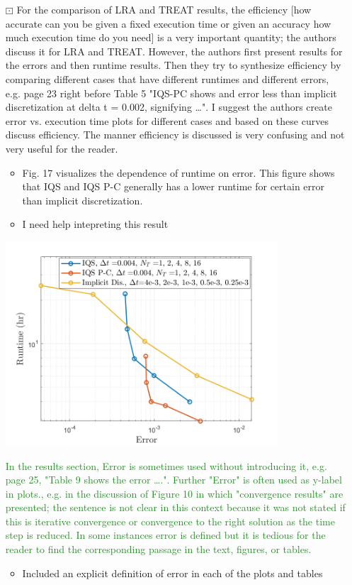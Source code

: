 \documentclass{elsarticle}
\newcommand{\working}{$\boxdot$}
\newcommand{\done}{\checkmark}
\newcommand{\easy}[1]{\textcolor{ForestGreen}{#1}}
\newcommand{\medm}[1]{\textcolor{BurntOrange}{#1}}
\begin{document}
\begin{itemize}
\item[\working] \medm{ For the comparison of LRA and TREAT results, the efficiency [how accurate can you be given a fixed execution time or given an accuracy how much execution time do you need] is a very important quantity; the authors discuss it for LRA and TREAT. However, the authors first present results for the errors and then runtime results. Then they try to synthesize efficiency by comparing different cases that have different runtimes and different errors, e.g. page 23 right before Table 5 "IQS-PC shows and error less than implicit discretization at delta t = 0.002, signifying …". I suggest the authors create error vs. execution time plots for different cases and based on these curves discuss efficiency. The manner efficiency is discussed is very confusing and not very useful for the reader. }
\begin{itemize}
\item Fig. 17 visualizes the dependence of runtime on error. This figure shows that IQS and IQS P-C generally has a lower runtime for certain error than implicit discretization.
\item I need help intepreting this result
\end{itemize}
\includegraphics[height=3in]{figures/lra_rt_vs_err.png}


\item[\done] \easy{ In the results section, Error is sometimes used without introducing it, e.g. page 25, "Table 9 shows the error ….". Further "Error" is often used as y-label in plots., e.g. in the discussion of Figure 10 in which "convergence results" are presented; the sentence is not clear in this context because it was not stated if this is iterative convergence or convergence to the right solution as the time step is reduced. In some instances error is defined but it is tedious for the reader to find the corresponding passage in the text, figures, or tables. }
\begin{itemize}
\item Included an explicit definition of error in each of the plots and tables
\end{itemize}


\end{itemize}
\end{document}
